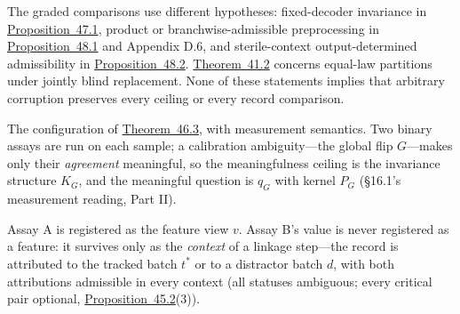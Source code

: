 The graded comparisons use different hypotheses: fixed-decoder invariance in \hyperlink{stmt:47.1}{Proposition~47.1}, product or branchwise-admissible preprocessing in \hyperlink{stmt:48.1}{Proposition~48.1} and Appendix D.6, and sterile-context output-determined admissibility in \hyperlink{stmt:48.2}{Proposition~48.2}. \hyperlink{stmt:41.2}{Theorem~41.2} concerns equal-law partitions under jointly blind replacement. None of these statements implies that arbitrary corruption preserves every ceiling or every record comparison.


The configuration of \hyperlink{stmt:46.3}{Theorem~46.3}, with measurement semantics. Two binary assays are run on each sample; a calibration ambiguity---\hspace{0pt}the global flip \(G\)---\hspace{0pt}makes only their \emph{agreement} meaningful, so the meaningfulness ceiling is the invariance structure \(K_G\), and the meaningful question is \(q_G\) with kernel \(P_G\) (§16.1's measurement reading, Part II).

Assay A is registered as the feature view \(v\). Assay B's value is never registered as a feature: it survives only as the \emph{context} of a linkage step---\hspace{0pt}the record is attributed to the tracked batch \(t^*\) or to a distractor batch \(d\), with both attributions admissible in every context (all statuses ambiguous; every critical pair optional, \hyperlink{stmt:45.2}{Proposition~45.2}(3)).

